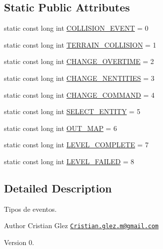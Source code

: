 \subsection*{Static Public Attributes}
\begin{DoxyCompactItemize}
\item 
static const long int \hyperlink{class_event_type_a096fc66c6f900edf9f3a266c4c981bfa}{C\+O\+L\+L\+I\+S\+I\+O\+N\+\_\+\+E\+V\+E\+N\+T} = 0
\item 
static const long int \hyperlink{class_event_type_a2e116fdf98748616b8dd518caefba94d}{T\+E\+R\+R\+A\+I\+N\+\_\+\+C\+O\+L\+L\+I\+S\+I\+O\+N} = 1
\item 
static const long int \hyperlink{class_event_type_a7c6c84e45483e730bc2259589a517dec}{C\+H\+A\+N\+G\+E\+\_\+\+O\+V\+E\+R\+T\+I\+M\+E} = 2
\item 
static const long int \hyperlink{class_event_type_acce4c6fe0be1a38d2eea02392a514704}{C\+H\+A\+N\+G\+E\+\_\+\+N\+E\+N\+T\+I\+T\+I\+E\+S} = 3
\item 
static const long int \hyperlink{class_event_type_a629e3d685d63919782264bfdce5a0840}{C\+H\+A\+N\+G\+E\+\_\+\+C\+O\+M\+M\+A\+N\+D} = 4
\item 
static const long int \hyperlink{class_event_type_ade218fb495bba6510f0c186034c55f4f}{S\+E\+L\+E\+C\+T\+\_\+\+E\+N\+T\+I\+T\+Y} = 5
\item 
static const long int \hyperlink{class_event_type_a39f91c1453a4c17e084d222006b91ccf}{O\+U\+T\+\_\+\+M\+A\+P} = 6
\item 
static const long int \hyperlink{class_event_type_ac2a930a6be10c5029dc2cda396501ed6}{L\+E\+V\+E\+L\+\_\+\+C\+O\+M\+P\+L\+E\+T\+E} = 7
\item 
static const long int \hyperlink{class_event_type_af4489d5bccfbcb7b95afc3ca19940038}{L\+E\+V\+E\+L\+\_\+\+F\+A\+I\+L\+E\+D} = 8
\end{DoxyCompactItemize}


\subsection{Detailed Description}
Tipos de eventos. 

\begin{DoxyAuthor}{Author}
Cristian Glez \href{mailto:Cristian.glez.m@gmail.com}{\tt Cristian.\+glez.\+m@gmail.\+com} 
\end{DoxyAuthor}
\begin{DoxyVersion}{Version}
0. 
\end{DoxyVersion}


